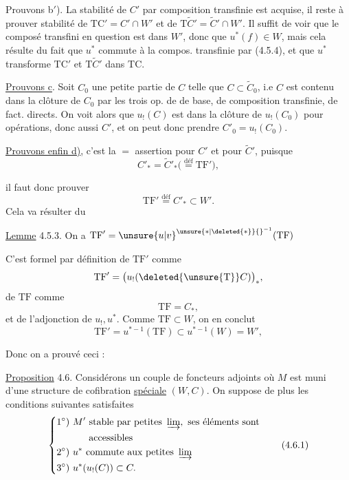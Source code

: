 Prouvons b$'$). La stabilité de $C'$ par composition transfinie est acquise, il reste à prouver  stabilité de $\mathrm{TC}'=C'\cap W'$ et de $\mathrm{T}\widetilde C'=\widetilde C'\cap W'$. Il suffit de voir que le composé transfini  en question est dans $W'$, donc que $u^*(f)\in W$, mais cela résulte du fait que $u^*$ commute à la compos. transfinie par (4.5.4), et que $u^*$ transforme $\mathrm{TC}'$ et $\mathrm{T}\widetilde C'$ dans $\mathrm{TC}$.

\uline{Prouvons c}. Soit $C_0$ une petite partie de $C$ telle que $C\subset\widetilde C_0$, i.e $C$ est contenu dans la clôture de $C_0$ par les trois op. de  de base, de composition transfinie, de fact. directs. On voit alors que $u_!(C)$ est dans la clôture de $u_!(C_0)$ pour  opérations, donc aussi $C'$, et on peut donc prendre $C'_0=u_!(C_0)$.

\uline{Prouvons enfin d)}, c'est la $=$ assertion pour $C'$ et pour $\widetilde C'$, puisque
\[
C'_*= \widetilde C'_* \bigl(\overset{\mathrm{déf}}{=}\mathrm{TF}'\bigr),
\]

il faut donc prouver
\[
\mathrm{TF}'\overset{\mathrm{déf}}{=}C'_*\subset W'.
\]
Cela va résulter du

\uline{Lemme} 4.5.3. On a $\mathrm{TF}'=\unsure{u|v}^{\unsure{*|\deleted{*}}{}^{-1}}(\mathrm{TF})$

C'est formel par définition de $\mathrm{TF}'$ comme
\[
\mathrm{TF}'=\bigl(u_!(\deleted{\unsure{\mathrm T}}C)\bigr)_*,
\]
de $\mathrm{TF}$ comme
\[
\mathrm{TF}=C_*,
\]
et de l'adjonction de $u_!,u^*$. Comme $\mathrm{TF}\subset W$, on en conclut
\[
\mathrm{TF}'=u^{*-1}(\mathrm{TF})\subset u^{*-1}(W)=W',
\]

Donc on a prouvé ceci :

\uline{Proposition} 4.6. Considérons un couple de foncteurs adjoints
où $M$ est muni d'une structure de cofibration \uline{spéciale} $(W,C)$. On suppose de plus les conditions suivantes satisfaites
\[
\left\{\begin{aligned} 1^\circ)&\ M'\ \text{stable par petites }\varinjlim,\ \text{ses éléments sont}\\ &\qquad\text{accessibles}\\ 2^\circ)&\ u^*\ \text{commute aux petites }\varinjlim\\ 3^\circ)&\ u^*(u_!(C))\subset C.
\end{aligned}\right.\tag*{(4.6.1)}
\]

